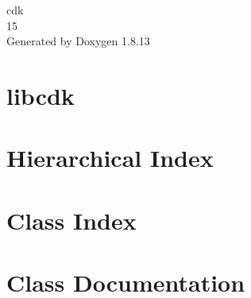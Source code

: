 \documentclass[twoside]{book}
\newcommand{\+}{\discretionary{\mbox{\scriptsize$\hookleftarrow$}}{}{}}
\newcommand{\clearemptydoublepage}{%
  \newpage{\pagestyle{empty}\cleardoublepage}%
}
\begin{document}
\begin{titlepage}
\vspace*{7cm}
\begin{center}%
{\Large cdk \\[1ex]\large 15 }\\
\vspace*{1cm}
{\large Generated by Doxygen 1.8.13}\\
\end{center}
\end{titlepage}
\clearemptydoublepage
{}
\tableofcontents
\clearemptydoublepage
{}

\chapter{libcdk}
\label{md_README}

\chapter{Hierarchical Index}

\chapter{Class Index}

\chapter{Class Documentation}

















































\backmatter
\newpage
{}
\clearemptydoublepage
{}
\printindex
\end{document}
